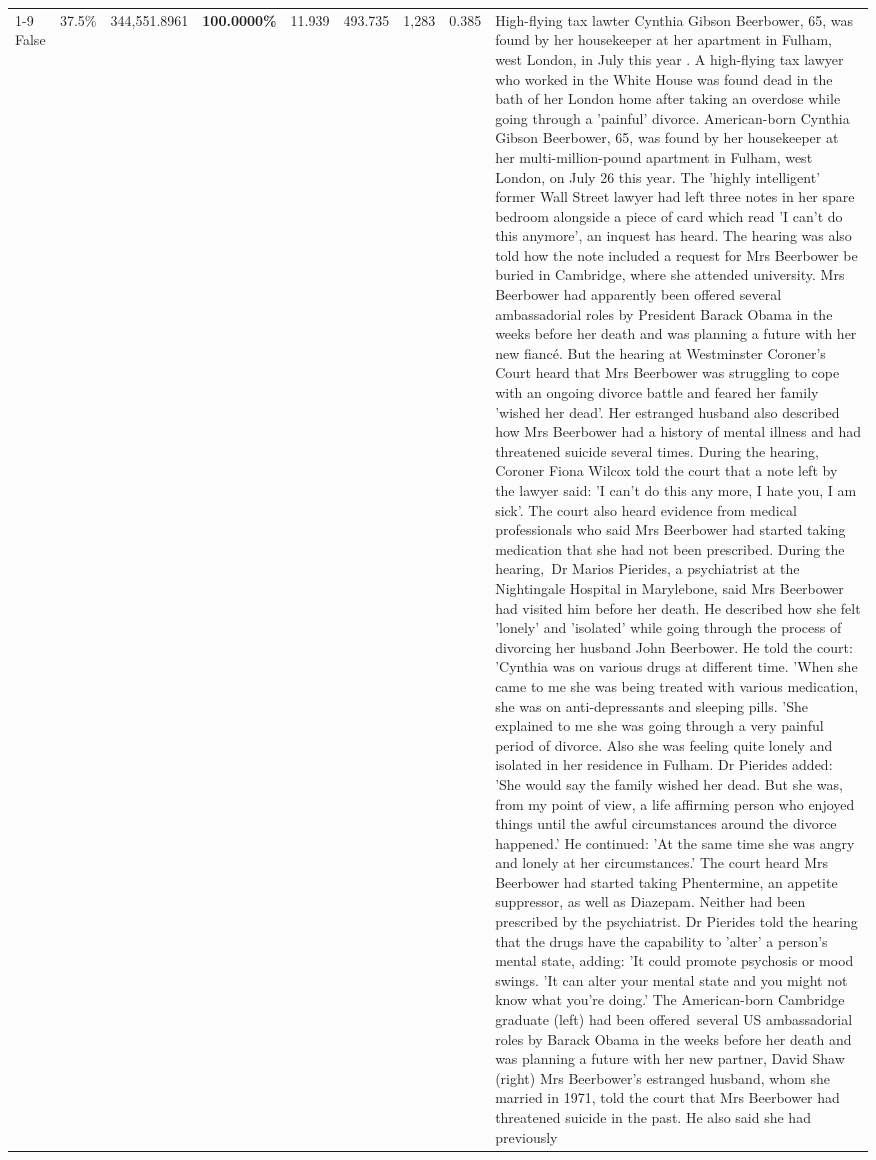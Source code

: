 \begin{table}[H]
\begin{tabular}{lllrlllll}
\cline{1-9}
False & 37.5\% & 344,551.8961 & \bfseries \color{red} 100.0000\% & 11.939 & 493.735 & 1,283 & 0.385 & High-flying tax lawter Cynthia Gibson Beerbower, 65, was found by her housekeeper at her apartment in Fulham, west London, in July this year . A high-flying tax lawyer who worked in the White House was found dead in the bath of her London home after taking an overdose while going through a 'painful' divorce. American-born Cynthia Gibson Beerbower, 65, was found by her housekeeper at her multi-million-pound apartment in Fulham, west London, on July 26 this year. The 'highly intelligent' former Wall Street lawyer had left three notes in her spare bedroom alongside a piece of card which read 'I can't do this anymore', an inquest has heard. The hearing was also told how the note included a request for Mrs Beerbower be buried in Cambridge, where she attended university. Mrs Beerbower had apparently been offered several ambassadorial roles by President Barack Obama in the weeks before her death and was planning a future with her new fiancé. But the hearing at Westminster Coroner's Court heard that Mrs Beerbower was struggling to cope with an ongoing divorce battle and feared her family 'wished her dead'. Her estranged husband also described how Mrs Beerbower had a history of mental illness and had threatened suicide several times. During the hearing, Coroner Fiona Wilcox told the court that a note left by the lawyer said: 'I can't do this any more, I hate you, I am sick'. The court also heard evidence from medical professionals who said Mrs Beerbower had started taking medication that she had not been prescribed. During the hearing, Dr Marios Pierides, a psychiatrist at the Nightingale Hospital in Marylebone, said Mrs Beerbower had visited him before her death. He described how she felt 'lonely' and 'isolated' while going through the process of divorcing her husband John Beerbower. He told the court: 'Cynthia was on various drugs at different time. 'When she came to me she was being treated with various medication, she was on anti-depressants and sleeping pills. 'She explained to me she was going through a very painful period of divorce. Also she was feeling quite lonely and isolated in her residence in Fulham. Dr Pierides added: 'She would say the family wished her dead. But she was, from my point of view, a life affirming person who enjoyed things until the awful circumstances around the divorce happened.' He continued: 'At the same time she was angry and lonely at her circumstances.' The court heard Mrs Beerbower had started taking Phentermine, an appetite suppressor, as well as Diazepam. Neither had been prescribed by the psychiatrist. Dr Pierides told the hearing that the drugs have the capability to 'alter' a person's mental state, adding: 'It could promote psychosis or mood swings. 'It can alter your mental state and you might not know what you're doing.' The American-born Cambridge graduate (left) had been offered several US ambassadorial roles by Barack Obama in the weeks before her death and was planning a future with her new partner, David Shaw (right) Mrs Beerbower's estranged husband, whom she married in 1971, told the court that Mrs Beerbower had threatened suicide in the past. He also said she had previously 
\end{tabular}
\end{table}
